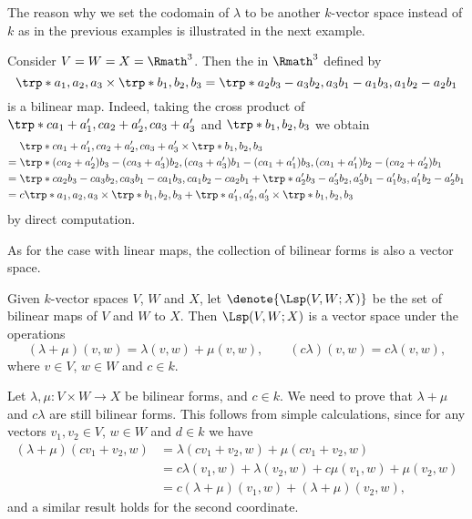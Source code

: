 The reason why we set the codomain of \(\lambda\)
to be another \(k\)-vector space instead of \(k\)
as in the previous examples
is illustrated in the next example.

\begin{example}
    \label{exm:bilinear3}
    Consider \(V=W=X=\Rmath^3\).
    Then the  in \(\Rmath^3\) defined by
    \[
        \trp*{a_1,a_2,a_3}\times\trp*{b_1,b_2,b_3}
        =\trp*{a_2b_3-a_3b_2,a_3b_1-a_1b_3,a_1b_2-a_2b_1}
    \]
    is a bilinear map.
    Indeed, taking the cross product of
    \(\trp*{ca_1+a_1',ca_2+a_2',ca_3+a_3'}\) and \(\trp*{b_1,b_2,b_3}\)
    we obtain
    \begin{align*}
        &\trp*{ca_1+a_1',ca_2+a_2',ca_3+a_3'}\times\trp*{b_1,b_2,b_3} \\
        ={}&\trp*{(ca_2+a_2')b_3-(ca_3+a_3')b_2,
            (ca_3+a_3')b_1-(ca_1+a_1')b_3,
            (ca_1+a_1')b_2-(ca_2+a_2')b_1} \\
        ={}&\trp*{ca_2b_3-ca_3b_2,ca_3b_1-ca_1b_3,ca_1b_2-ca_2b_1}
            +\trp*{a_2'b_3-a_3'b_2,a_3'b_1-a_1'b_3,a_1'b_2-a_2'b_1} \\
        ={}&c\trp*{a_1,a_2,a_3}\times\trp*{b_1,b_2,b_3}
            +\trp*{a_1',a_2',a_3'}\times\trp*{b_1,b_2,b_3}
    \end{align*}
    by direct computation.
\end{example}

As for the case with linear maps,
the collection of bilinear forms is also a vector space.

\begin{observation}
    \label{obv:blnvsp}
    Given \(k\)-vector spaces \(V\), \(W\) and \(X\),
    let \(\denote{\Lsp(V,W;X)}\) be
    the set of bilinear maps of \(V\) and \(W\) to \(X\).
    Then \(\Lsp(V,W;X)\) is a vector space under the operations
    \[
        (\lambda+\mu)(v,w)
        =\lambda(v,w)+\mu(v,w),
        \qquad
        (c\lambda)(v,w)
        =c\lambda(v,w),
    \]
    where \(v\in V\), \(w\in W\) and \(c\in k\).
\end{observation}
\begin{myproof}
    Let \(\lambda,\mu:V\times W\to X\) be bilinear forms,
    and \(c\in k\).
    We need to prove that
    \(\lambda+\mu\) and \(c\lambda\) are still bilinear forms.
    This follows from simple calculations,
    since for any vectors \(v_1,v_2\in V\), \(w\in W\)
    and \(d\in k\) we have
    \begin{align*}
        (\lambda+\mu)(cv_1+v_2,w)
        &=\lambda(cv_1+v_2,w)+\mu(cv_1+v_2,w) \\
        &=c\lambda(v_1,w)+\lambda(v_2,w)+c\mu(v_1,w)+\mu(v_2,w) \\
        &=c(\lambda+\mu)(v_1,w)+(\lambda+\mu)(v_2,w),
    \end{align*}
    and a similar result holds for the second coordinate.
\end{myproof}

